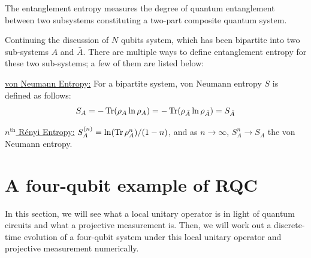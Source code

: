 \documentclass[11pt, oneside]{scrbook}
\begin{document}
\begin{definition}
    The entanglement entropy measures the degree of quantum entanglement between two subsystems constituting a two-part composite quantum system.
\end{definition}
Continuing the discussion of \(N\) qubits system, which has been bipartite into two sub-systems \(A\) and \(\bar{A}\).
There are multiple ways to define entanglement entropy for these two sub-systems; a few of them are listed below:
\begin{list}{}{}
    \item[\uline{von Neumann Entropy:}] For a bipartite system, von Neumann entropy \(S\) is defined as follows:
        \begin{equation}
            S_{A} = - \Tr(\rho_{A} \ln \rho_{A}) = - \Tr(\rho_{\bar{A}} \ln \rho_{\bar{A}}) = S_{\bar{A}}
        \end{equation}

    \item[\uline{\(n^\text{th}\) R\'enyi Entropy:}] \(S_{A}^{(n)} = \ln(\Tr \rho_{A}^n) / (1 - n)\), and as \(n \to \infty\), \(S_A^n \to S_A\) \ie the von Neumann entropy.
\end{list}


\section{A four-qubit example of RQC}

In this section, we will see what a local unitary operator is in light of quantum circuits and what a projective measurement is. Then, we will work out a discrete-time evolution of a four-qubit system under this local unitary operator and projective measurement numerically.
\end{document}
